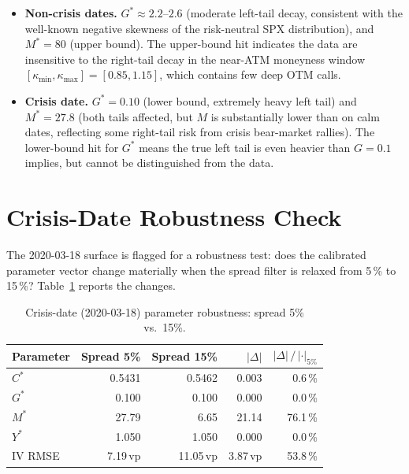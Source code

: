 \documentclass[11pt,a4paper]{article}
\begin{document}
\begin{itemize}
  \item \textbf{Non-crisis dates.}
    $G^* \approx 2.2$--$2.6$ (moderate left-tail decay, consistent with
    the well-known negative skewness of the risk-neutral SPX distribution),
    and $M^* = 80$ (upper bound).  The upper-bound hit indicates the data
    are insensitive to the right-tail decay in the near-ATM moneyness
    window $[\kappa_{\min}, \kappa_{\max}] = [0.85, 1.15]$,
    which contains few deep OTM calls.

  \item \textbf{Crisis date.}
    $G^* = 0.10$ (lower bound, extremely heavy left tail) and $M^* = 27.8$
    (both tails affected, but $M$ is substantially lower than on calm dates,
    reflecting some right-tail risk from crisis bear-market rallies).
    The lower-bound hit for $G^*$ means the true left tail is even heavier
    than $G=0.1$ implies, but cannot be distinguished from the data.
\end{itemize}

\section{Crisis-Date Robustness Check}
\label{sec:robustness}

The 2020-03-18 surface is flagged for a robustness test: does the calibrated
parameter vector change materially when the spread filter is relaxed from
5\,\% to 15\,\%?
Table~\ref{tab:robustness} reports the changes.

\begin{table}[ht]
\centering
\caption{Crisis-date (2020-03-18) parameter robustness: spread 5\% vs.\ 15\%.}
\label{tab:robustness}
\setlength{\tabcolsep}{8pt}
\begin{tabular}{lrrrr}
\toprule
Parameter & Spread 5\% & Spread 15\% & $|\Delta|$
  & $|\Delta|\,/\,|\cdot|_{\text{5\%}}$ \\
\midrule
$C^*$ & 0.5431 & 0.5462 & 0.003 & 0.6\,\% \\
$G^*$ & 0.100  & 0.100  & 0.000 & 0.0\,\% \\
$M^*$ & 27.79  & 6.65   & 21.14 & 76.1\,\% \\
$Y^*$ & 1.050  & 1.050  & 0.000 & 0.0\,\% \\
\midrule
IV RMSE & 7.19\,vp & 11.05\,vp & 3.87\,vp & 53.8\,\% \\
\bottomrule
\end{tabular}
\end{table}
\end{document}
